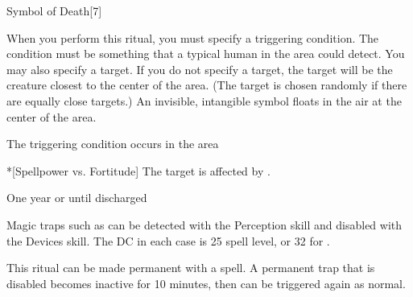 \begin{spellsection}{Symbol of Death}[7]
    \begin{spellheader}
    \end{spellheader}
    \begin{spellcontent}
        \begin{spelltargetinginfo}
        \end{spelltargetinginfo}
        \begin{spelleffects}
            \spellspecial When you perform this ritual, you must specify a triggering condition. The condition must be something that a typical human in the area could detect. You may also specify a target. If you do not specify a target, the target will be the creature closest to the center of the area. (The target is chosen randomly if there are equally close targets.)
            \spelleffect An invisible, intangible symbol floats in the air at the center of the area.
            \begin{spelltrigger}{The triggering condition occurs in the area}
                \begin{spelltarget}*[Spellpower vs. Fortitude]
                    \spellsuccess The target is affected by .
                \end{spelltarget}
            \end{spelltrigger}

            \spelldur One year or until discharged
        \end{spelleffects}
    \end{spellcontent}
    \begin{spellfooter}
        \spellnotes Magic traps such as  can be detected with the Perception skill and disabled with the Devices skill. The DC in each case is 25 \add spell level, or 32 for .
        \par This ritual can be made permanent with a  spell. A permanent trap that is disabled becomes inactive for 10 minutes, then can be triggered again as normal.
    \end{spellfooter}
\end{spellsection}

